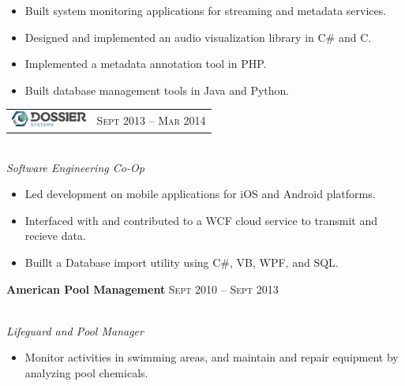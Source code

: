 \documentclass[10pt]{article}
\begin{document}
{\begin{minipage}[t]{0.5\textwidth}
\begin{itemize}
  \setlength\itemsep{0.4mm}
  \item[\ding{226}] Built system monitoring applications for streaming and metadata services.
  \item[\ding{226}] Designed and implemented an audio visualization library in C\# and C.
  \item[\ding{226}] Implemented a metadata annotation tool in PHP.
   \item[\ding{226}] Built database management tools in Java and Python.
\end{itemize}


\begin{tabular}{ L{5cm} R{3.5cm} }
\includegraphics[height=0.5cm]{dossier} & 
{\raggedleft\textsc{Sept 2013 -- Mar 2014}} \\
\end{tabular}
{\raggedright\large\\
\textit{Software Engineering Co-Op}\\[5pt]}



\begin{itemize}
  \setlength\itemsep{0.4mm}
  \item[\ding{226}] Led development on mobile applications for iOS and Android platforms.
  \item[\ding{226}] Interfaced with and contributed to a WCF cloud service to transmit and recieve data.
  \item[\ding{226}] Buillt a Database import utility using C\#, VB, WPF, and SQL.
\end{itemize}

\textbf{American Pool Management} \hfill \textsc{Sept 2010 -- Sept 2013}
{\raggedright\large\\
\textit{Lifeguard and Pool Manager}\\[5pt]}
\vspace{-0.5 cm}
\begin{itemize}
  \item[\ding{226}] Monitor activities in swimming areas, and maintain and repair equipment by analyzing pool chemicals.
\end{itemize}


\end{minipage}}
\end{document}
